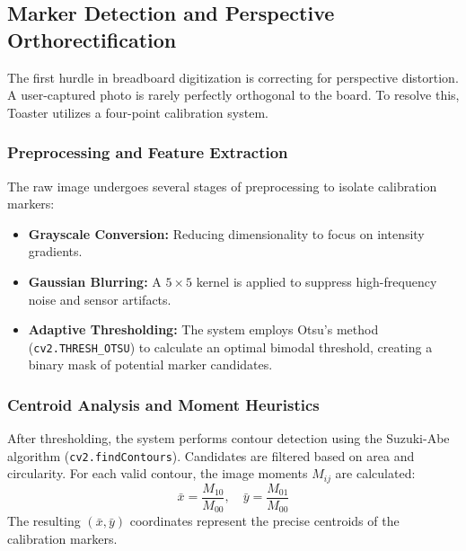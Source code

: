\documentclass[11pt,a4paper]{article}
\begin{document}
\subsection{Marker Detection and Perspective Orthorectification}
The first hurdle in breadboard digitization is correcting for perspective distortion. A user-captured photo is rarely perfectly orthogonal to the board. To resolve this, Toaster utilizes a four-point calibration system.

\subsubsection{Preprocessing and Feature Extraction}
The raw image undergoes several stages of preprocessing to isolate calibration markers:
\begin{itemize}
    \item \textbf{Grayscale Conversion:} Reducing dimensionality to focus on intensity gradients.
    \item \textbf{Gaussian Blurring:} A $5 \times 5$ kernel is applied to suppress high-frequency noise and sensor artifacts.
    \item \textbf{Adaptive Thresholding:} The system employs Otsu's method (\texttt{cv2.THRESH\_OTSU}) to calculate an optimal bimodal threshold, creating a binary mask of potential marker candidates.
\end{itemize}

\subsubsection{Centroid Analysis and Moment Heuristics}
After thresholding, the system performs contour detection using the Suzuki-Abe algorithm (\texttt{cv2.findContours}). Candidates are filtered based on area and circularity. For each valid contour, the image moments $M_{ij}$ are calculated:
\begin{equation}
    \bar{x} = \frac{M_{10}}{M_{00}}, \quad \bar{y} = \frac{M_{01}}{M_{00}}
\end{equation}
The resulting $(\bar{x}, \bar{y})$ coordinates represent the precise centroids of the calibration markers.
\end{document}
